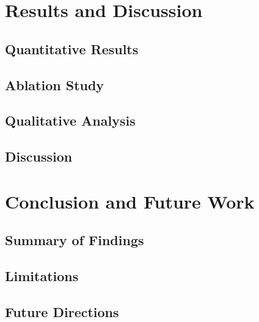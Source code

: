 \documentclass[sigconf]{acmart}
\begin{document}
\section{Results and Discussion}
\subsection{Quantitative Results}
\subsection{Ablation Study}
\subsection{Qualitative Analysis}
\subsection{Discussion}

\section{Conclusion and Future Work}
\label{sec:conclusion}
\subsection{Summary of Findings}
\subsection{Limitations}
\subsection{Future Directions}

\begin{acks}
\end{acks}



\end{document}
